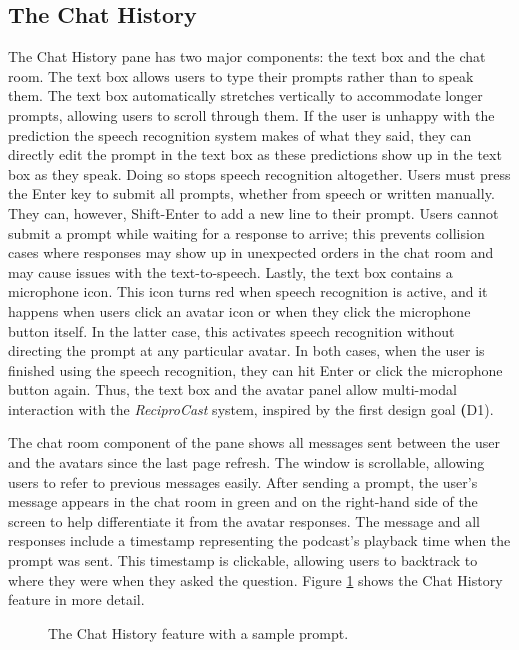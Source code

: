 \documentclass[12pt]{report}
\begin{document}
\begin{myfont}
        \subsection{The Chat History}
        \indent The Chat History pane has two major components: the text box and the chat room. The text box allows users to type their prompts rather than to speak them. The text box automatically stretches vertically to accommodate longer prompts, allowing users to scroll through them. If the user is unhappy with the prediction the speech recognition system makes of what they said, they can directly edit the prompt in the text box as these predictions show up in the text box as they speak. Doing so stops speech recognition altogether. Users must press the Enter key to submit all prompts, whether from speech or written manually. They can, however, Shift-Enter to add a new line to their prompt. Users cannot submit a prompt while waiting for a response to arrive; this prevents collision cases where responses may show up in unexpected orders in the chat room and may cause issues with the text-to-speech. Lastly, the text box contains a microphone icon. This icon turns red when speech recognition is active, and it happens when users click an avatar icon or when they click the microphone button itself. In the latter case, this activates speech recognition without directing the prompt at any particular avatar. In both cases, when the user is finished using the speech recognition, they can hit Enter or click the microphone button again. Thus, the text box and the avatar panel allow multi-modal interaction with the \textit{ReciproCast} system, inspired by the first design goal \textbf(D1).  
        
        \indent The chat room component of the pane shows all messages sent between the user and the avatars since the last page refresh. The window is scrollable, allowing users to refer to previous messages easily. After sending a prompt, the user's message appears in the chat room in green and on the right-hand side of the screen to help differentiate it from the avatar responses. The message and all responses include a timestamp representing the podcast's playback time when the prompt was sent. This timestamp is clickable, allowing users to backtrack to where they were when they asked the question. Figure \ref{fig:chathistory} shows the Chat History feature in more detail. 

        \begin{figure}[H]
              \caption{The Chat History feature with a sample prompt.}
              \label{fig:chathistory}
        \end{figure}


\end{myfont}
\end{document}
